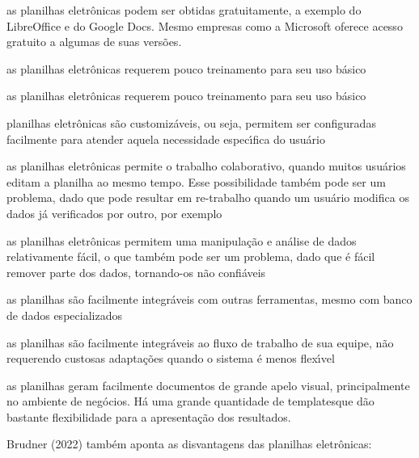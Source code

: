 \documentclass[
12pt,		%
openright,	%
twoside,  %
a4paper,			%
chapter=TITLE,		%
english,			%
french,				%
spanish,			%
brazil				%
]{USPSC-classe/USPSC_RedarTex}
\begin{document}
\begin{alineas}
\item as planilhas eletr\^onicas podem ser obtidas gratuitamente, a exemplo do LibreOffice e do Google Docs. Mesmo empresas como a Microsoft oferece acesso gratuito a algumas de suas vers\~oes.
\item as planilhas eletr\^onicas requerem pouco treinamento para seu uso b\'asico
\item as planilhas eletr\^onicas requerem pouco treinamento para seu uso b\'asico
\item planilhas eletr\^onicas s\~ao \textquotedbl customiz\'aveis\textquotedbl , ou seja, permitem ser configuradas facilmente para atender aquela necessidade espec\'{\i}fica do usu\'ario
\item as planilhas eletr\^onicas permite o trabalho colaborativo, quando muitos usu\'arios editam a planilha ao mesmo tempo. Esse possibilidade tamb\'em pode ser um problema, dado que pode resultar em re-trabalho quando um usu\'ario modifica os dados j\'a verificados por outro, por exemplo
\item as planilhas eletr\^onicas permitem uma manipula\c{c}\~ao e an\'alise de dados relativamente f\'acil, o que tamb\'em pode ser um problema, dado que \'e f\'acil remover parte dos dados, tornando-os n\~ao confi\'aveis
\item as planilhas s\~ao facilmente integr\'aveis com outras  ferramentas, mesmo com banco de dados especializados
\item as planilhas s\~ao facilmente integr\'aveis ao fluxo de trabalho de sua equipe, n\~ao requerendo custosas adapta\c{c}\~oes quando o sistema \'e menos flex\'{\i}vel
\item as planilhas geram facilmente documentos de grande apelo visual, principalmente no ambiente de neg\'ocios. H\'a uma grande quantidade de \textquotedbl templates\textquotedbl  que d\~ao bastante flexibilidade para a apresenta\c{c}\~ao dos resultados.
\end{alineas}

 Brudner (2022) tamb\'em aponta as disvantagens das planilhas eletr\^onicas:
\end{document}
